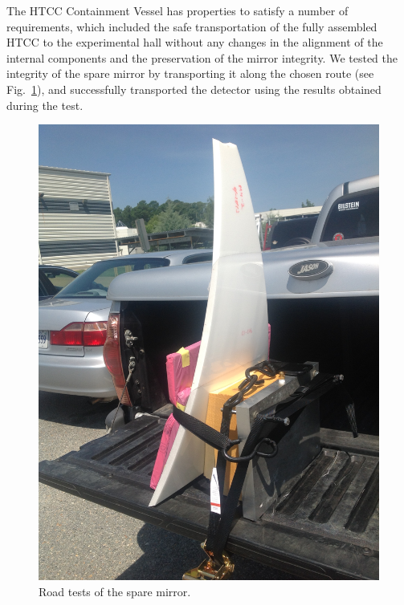 The HTCC Containment Vessel has properties to satisfy a number of requirements, which included the safe
transportation of the fully assembled HTCC to the experimental hall without any changes in the alignment of the
internal components and the preservation of the mirror integrity. We tested the integrity of the spare mirror by
transporting it along the chosen route (see Fig.~\ref{fig:transportation_spare_mirror}), and successfully
transported the detector using the results obtained during the test. 

\begin{figure}[ht]
    \centering
    \includegraphics[trim={1.5cm 5cm 0 2cm }, clip, width=\linewidth]{images/Road_Test.JPG}
    \caption{Road tests of the spare mirror.}
    \label{fig:transportation_spare_mirror}
\end{figure}

  

